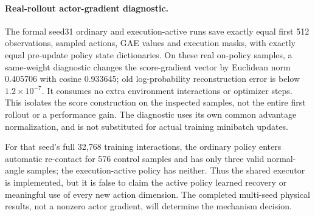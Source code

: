 \paragraph{Real-rollout actor-gradient diagnostic.}
The formal seed31 ordinary and execution-active runs save exactly equal first 512 observations, sampled actions, GAE values and execution masks, with exactly equal pre-update policy state dictionaries. On these real on-policy samples, a same-weight diagnostic changes the score-gradient vector by Euclidean norm 0.405706 with cosine 0.933645; old log-probability reconstruction error is below $1.2\times10^{-7}$. It consumes no extra environment interactions or optimizer steps. This isolates the score construction on the inspected samples, not the entire first rollout or a performance gain. The diagnostic uses its own common advantage normalization, and is not substituted for actual training minibatch updates.

For that seed's full 32,768 training interactions, the ordinary policy enters automatic re-contact for 576 control samples and has only three valid normal-angle samples; the execution-active policy has neither. Thus the shared executor is implemented, but it is false to claim the active policy learned recovery or meaningful use of every new action dimension. The completed multi-seed physical results, not a nonzero actor gradient, will determine the mechanism decision.
